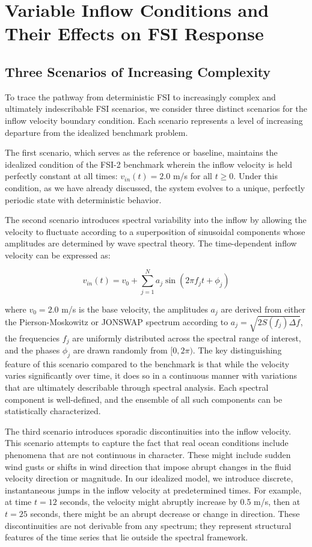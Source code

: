 ﻿\documentclass[a4paper,11pt]{article}
\theoremstyle{definition}
\begin{document}
\section{Variable Inflow Conditions and Their Effects on FSI Response}

\subsection{Three Scenarios of Increasing Complexity}

To trace the pathway from deterministic FSI to increasingly complex and ultimately indescribable FSI scenarios, we consider three distinct scenarios for the inflow velocity boundary condition. Each scenario represents a level of increasing departure from the idealized benchmark problem.

The first scenario, which serves as the reference or baseline, maintains the idealized condition of the FSI-2 benchmark wherein the inflow velocity is held perfectly constant at all times: $v_{in}(t) = 2.0$ m/s for all $t \geq 0$. Under this condition, as we have already discussed, the system evolves to a unique, perfectly periodic state with deterministic behavior.

The second scenario introduces spectral variability into the inflow by allowing the velocity to fluctuate according to a superposition of sinusoidal components whose amplitudes are determined by wave spectral theory. The time-dependent inflow velocity can be expressed as:

\begin{equation}
v_{in}(t) = v_0 + \sum_{j=1}^{N} a_j \sin(2\pi f_j t + \phi_j)
\label{eq:spectral_inflow}
\end{equation}

where $v_0 = 2.0$ m/s is the base velocity, the amplitudes $a_j$ are derived from either the Pierson-Moskowitz or JONSWAP spectrum according to $a_j = \sqrt{2 S(f_j) \Delta f}$, the frequencies $f_j$ are uniformly distributed across the spectral range of interest, and the phases $\phi_j$ are drawn randomly from $[0, 2\pi)$. The key distinguishing feature of this scenario compared to the benchmark is that while the velocity varies significantly over time, it does so in a continuous manner with variations that are ultimately describable through spectral analysis. Each spectral component is well-defined, and the ensemble of all such components can be statistically characterized.

The third scenario introduces sporadic discontinuities into the inflow velocity. This scenario attempts to capture the fact that real ocean conditions include phenomena that are not continuous in character. These might include sudden wind gusts or shifts in wind direction that impose abrupt changes in the fluid velocity direction or magnitude. In our idealized model, we introduce discrete, instantaneous jumps in the inflow velocity at predetermined times. For example, at time $t = 12$ seconds, the velocity might abruptly increase by 0.5 m/s, then at $t = 25$ seconds, there might be an abrupt decrease or change in direction. These discontinuities are not derivable from any spectrum; they represent structural features of the time series that lie outside the spectral framework.
\end{document}
